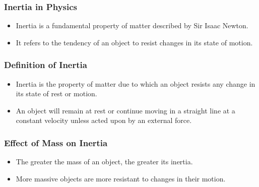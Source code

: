 \documentclass{beamer}
\begin{document}
\begin{frame}
\frametitle{Inertia in Physics}
\begin{itemize}
  \item Inertia is a fundamental property of matter described by Sir Isaac Newton.
  \item It refers to the tendency of an object to resist changes in its state of motion.
\end{itemize}

\end{frame}

\begin{frame}
\frametitle{Definition of Inertia}
\begin{itemize}
  \item Inertia is the property of matter due to which an object resists any change in its state of rest or motion.
  \item An object will remain at rest or continue moving in a straight line at a constant velocity unless acted upon by an external force.
\end{itemize}

\end{frame}

\begin{frame}
\frametitle{Effect of Mass on Inertia}
\begin{itemize}
  \item The greater the mass of an object, the greater its inertia.
  \item More massive objects are more resistant to changes in their motion.
\end{itemize}

\end{frame}
\end{document}
